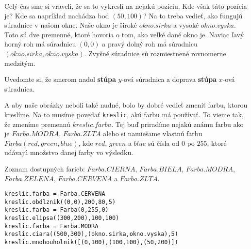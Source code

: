 
Celý čas sme si vraveli, že sa to vykreslí na nejakú pozíciu. Kde však táto pozícia je? Kde sa napríklad nachádza bod $(50,100)$? Na to treba vedieť,
ako fungujú súradnice v našom okne. Naše okno je široké $okno.sirka$ a vysoké $okno.vyska$. Toto sú dve premenné, ktoré hovoria o tom, ako veľké dané
okno je. Naviac ľavý horný roh má súradnicu $(0,0)$ a pravý dolný roh má súradnicu $(okno.sirka,okno.vyska)$. Zvyšné súradnice sú rozmiestnené
rovnomerne medzitým.

Uvedomte si, že smerom nadol \textbf{stúpa} $y$-ová súradnica a doprava \textbf{stúpa} $x$-ová súradnica.


A aby naše obrázky neboli také nudné, bolo by dobré vedieť zmeniť farbu, ktorou kreslíme. Na to musíme povedať \texttt{kreslic}, akú farbu má používať.
To vieme tak, že zmeníme premennú $kreslic.farba$. Tej buď priradíme nejakú známu farbu ako je $Farba.MODRA$, $Farba.ZLTA$ alebo si namiešame vlastnú farbu
$Farba(red, green, blue)$, kde $red$, $green$ a $blue$ sú čísla od $0$ po $255$, ktoré udávajú množstvo danej farby vo výsledku.

Zoznam dostupných farieb: $Farba.CIERNA$, $Farba.BIELA$, $Farba.MODRA$, $Farba.ZELENA$, $Farba.CERVENA$ a $Farba.ZLTA$.


\begin{lstlisting}
kreslic.farba = Farba.CERVENA
kreslic.obdlznik((0,0),200,80,5)
kreslic.farba = Farba(0,255,0)
kreslic.elipsa((300,200),100,100)
kreslic.farba = Farba.MODRA
kreslic.ciara((500,300),(okno.sirka,okno.vyska),5)
kreslic.mnohouholnik([(0,100),(100,100),(50,200)])
\end{lstlisting}


